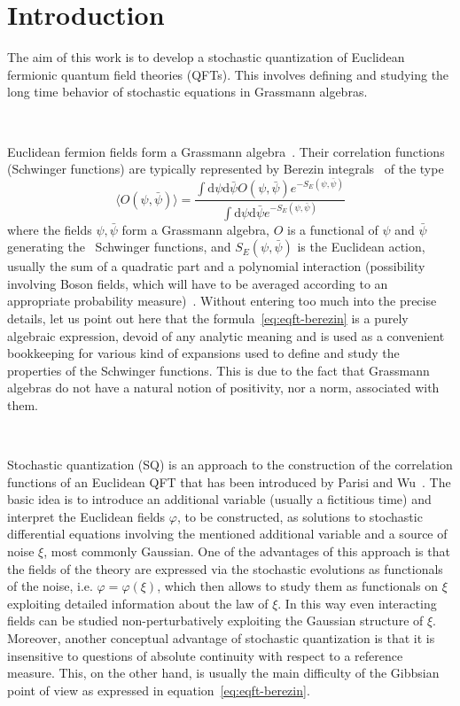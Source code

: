 \documentclass{article}
\newcommand{\mathd}{\mathrm{d}}
\begin{document}
\section{Introduction}

The aim of this work is to develop a stochastic quantization of Euclidean
fermionic quantum field theories (QFTs). This involves defining and studying
the long time behavior of stochastic equations in Grassmann algebras.

\

Euclidean fermion fields form a Grassmann
algebra~{\cite{osterwalder_euclidean_1973,osterwalder_euclidean_1973-2}}.
Their correlation functions (Schwinger functions) are typically represented by
Berezin integrals~{\cite{kirillov_introduction_1987}} of the type
\begin{equation}
  \langle O (\psi, \bar{\psi}) \rangle = \frac{\int \mathd \psi \mathd
  \bar{\psi} O (\psi, \bar{\psi}) e^{- S_E (\psi, \bar{\psi})}}{\int \mathd
  \psi \mathd \bar{\psi} e^{- S_E (\psi, \bar{\psi})}} \label{eq:eqft-berezin}
\end{equation}
where the fields $\psi, \bar{\psi}$ form a Grassmann algebra, $O$ is a
functional of $\psi$ and $\bar{\psi}$ generating the \ Schwinger functions,
and $S_E (\psi, \bar{\psi})$ is the Euclidean action, usually the sum of a
quadratic part and a polynomial interaction (possibility involving Boson
fields, which will have to be averaged according to an appropriate probability
measure)~{\cite{feldman_renormalizable_1986,disertori_continuous_1998,mastropietro_non-perturbative_2008}}.
Without entering too much into the precise details, let us point out here that
the formula~{\eqref{eq:eqft-berezin}} is a purely algebraic expression, devoid
of any analytic meaning and is used as a convenient bookkeeping for various
kind of expansions used to define and study the properties of the Schwinger
functions. This is due to the fact that Grassmann algebras do not have a
natural notion of positivity, nor a norm, associated with them.

\

Stochastic quantization (SQ) is an approach to the construction of the
correlation functions of an Euclidean QFT that has been introduced by Parisi
and Wu~{\cite{parisi_perturbation_1981}}. The basic idea is to introduce an
additional variable (usually a fictitious time) and interpret the Euclidean
fields $\varphi$, to be constructed, as solutions to stochastic differential
equations involving the mentioned additional variable and a source of noise
$\xi$, most commonly Gaussian. One of the advantages of this approach is that
the fields of the theory are expressed via the stochastic evolutions as
functionals of the noise, i.e. $\varphi = \varphi (\xi)$, which then allows to
study them as functionals on $\xi$ exploiting detailed information about the
law of $\xi$. In this way even interacting fields can be studied
non-perturbatively exploiting the Gaussian structure of $\xi$. Moreover,
another conceptual advantage of stochastic quantization is that it is
insensitive to questions of absolute continuity with respect to a reference
measure. This, on the other hand, is usually the main difficulty of the
Gibbsian point of view as expressed in equation~{\eqref{eq:eqft-berezin}}.
\end{document}
